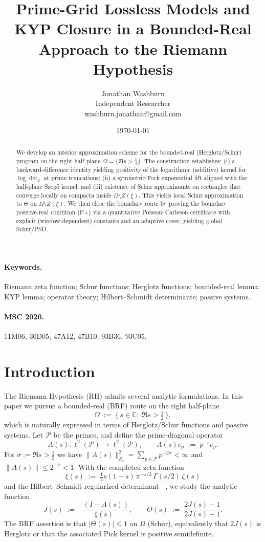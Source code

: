 \documentclass[11pt]{article}
\title{Prime-Grid Lossless Models and KYP Closure in a Bounded-Real Approach to the Riemann Hypothesis}
\author{Jonathan Washburn\\ Independent Researcher\\ \href{mailto:washburn.jonathan@gmail.com}{washburn.jonathan@gmail.com}}
\date{\today}
\theoremstyle{definition}
\theoremstyle{remark}
\newcommand{\C}{\mathbb{C}}
\newcommand{\PP}{\mathcal{P}}
\newcommand{\HS}{\mathcal{S}_2}
\newcommand{\Half}{\{\,s\in\C:\ \Re s>\tfrac12\,\}}
\DeclareMathOperator{\dettwo}{det_2}
\begin{document}
\maketitle

\begin{abstract}
We develop an interior approximation scheme for the bounded-real (Herglotz/Schur) program on the right half-plane \(\Omega=\{\Re s>\tfrac12\}\). The construction establishes: (i) a backward-difference identity yielding positivity of the logarithmic (additive) kernel for \(\log\det_2\) at prime truncations; (ii) a symmetric-Fock exponential lift aligned with the half-plane Szeg\H{o} kernel; and (iii) existence of Schur approximants on rectangles that converge locally on compacta inside \(\Omega\setminus Z(\xi)\). This yields local Schur approximation to \(\Theta\) on \(\Omega\setminus Z(\xi)\). We then close the boundary route by proving the boundary positive-real condition (P+) via a quantitative Poisson--Carleson certificate with explicit (window-dependent) constants and an adaptive cover, yielding global Schur/PSD.
\end{abstract}

\paragraph{Keywords.} Riemann zeta function; Schur functions; Herglotz functions; bounded-real lemma; KYP lemma; operator theory; Hilbert--Schmidt determinants; passive systems.

\paragraph{MSC 2020.} 11M06, 30D05, 47A12, 47B10, 93B36, 93C05.

\section{Introduction}
The Riemann Hypothesis (RH) admits several analytic formulations. In this paper we pursue a bounded-real (BRF) route on the right half-plane
\[
 \Omega\;:=\;\Half,
\]
which is naturally expressed in terms of Herglotz/Schur functions and passive systems. Let \(\PP\) be the primes, and define the prime-diagonal operator
\[
 A(s):\ell^2(\PP)\to\ell^2(\PP),\qquad A(s)e_p\;:=\;p^{-s}e_p.
\]
For \(\sigma:=\Re s>\tfrac12\) we have \(\|A(s)\|_{\HS}^2=\sum_{p\in\PP}p^{-2\sigma}<\infty\) and \(\|A(s)\|\le 2^{-\sigma}<1\). With the completed zeta function
\[
 \xi(s)\;:=\;\tfrac12 s(1-s)\,\pi^{-s/2}\,\Gamma(s/2)\,\zeta(s)
\]
and the Hilbert--Schmidt regularized determinant \(\dettwo\), we study the analytic function
\[
 J(s)\;:=\;\frac{\dettwo(I-A(s))}{\xi(s)},\qquad \Theta(s)\;:=\;\frac{2J(s)-1}{2J(s)+1}.
\]
The BRF assertion is that \(|\Theta(s)|\le 1\) on \(\Omega\) (Schur), equivalently that \(2J(s)\) is Herglotz or that the associated Pick kernel is positive semidefinite.
\end{document}

